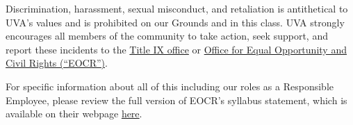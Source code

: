 \documentclass[12pt]{article}
\begin{document}
        Discrimination, harassment, sexual misconduct, and retaliation is antithetical to UVA’s values and is prohibited on our Grounds and in this class. UVA strongly encourages all members of the community to take action, seek support, and report these incidents to the \href{https://eocr.virginia.edu/title-ix}{Title IX office} or \href{https://eocr.virginia.edu/}{Office for Equal Opportunity and Civil Rights (“EOCR”)}. 
        
        For specific information about all of this including our roles as a Responsible Employee, please review the full version of EOCR's syllabus statement, which is available on their webpage \href{https://eocr.virginia.edu/syllabus}{here}.
\end{document}
